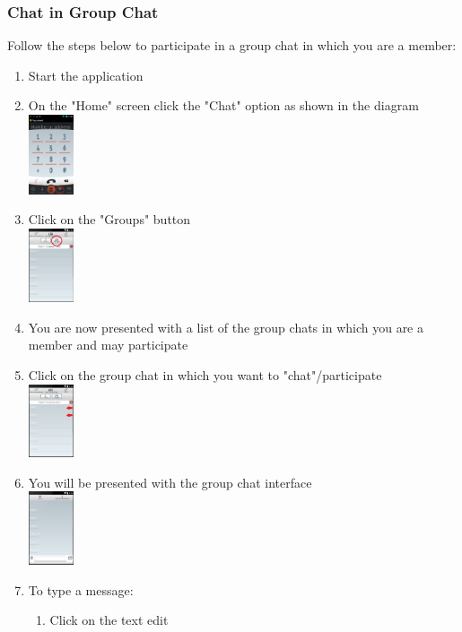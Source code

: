 \documentclass[11pt]{article}
\begin{document}
\subsubsection*{Chat in Group Chat}
Follow the steps below to participate in a group chat in which you are a member:
\begin{enumerate}
\item Start the application
\item On the "Home" screen click the "Chat" option as shown in the diagram\\
\includegraphics[width=50px]{images/mainScreen.png}
\item Click on the "Groups" button\\
\includegraphics[width=50px]{images/ChatlistNav.png}
\item You are now presented with a list of the group chats in which you are a member and may participate
\item Click on the group chat in which you want to "chat"/participate\\
\includegraphics[width=50px]{images/Grouplist.png}
\item You will be presented with the group chat interface\\
\includegraphics[width=50px]{images/groupchat.png}
\item To type a message:
\begin{enumerate}
\item Click on the text edit\\

\end{enumerate}
\end{enumerate}
\end{document}
